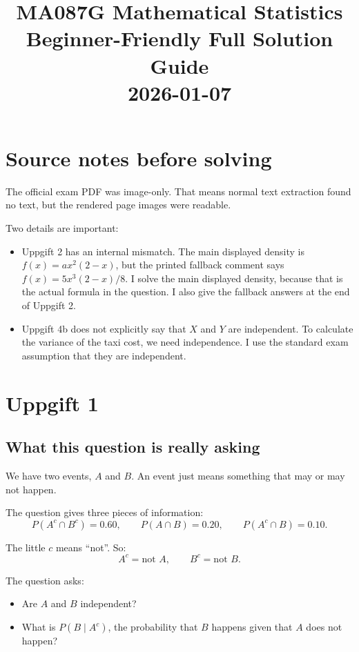 \documentclass[11pt,a4paper]{article}
\title{MA087G Mathematical Statistics\\Beginner-Friendly Full Solution Guide\\2026-01-07}
\author{}
\date{}
\begin{document}
\maketitle

\section*{Source notes before solving}
The official exam PDF was image-only. That means normal text extraction found no text, but the rendered page images were readable.

Two details are important:
\begin{itemize}[leftmargin=*]
    \item Uppgift 2 has an internal mismatch. The main displayed density is \(f(x)=a x^2(2-x)\), but the printed fallback comment says \(f(x)=5x^3(2-x)/8\). I solve the main displayed density, because that is the actual formula in the question. I also give the fallback answers at the end of Uppgift 2.
    \item Uppgift 4b does not explicitly say that \(X\) and \(Y\) are independent. To calculate the variance of the taxi cost, we need independence. I use the standard exam assumption that they are independent.
\end{itemize}

\section*{Uppgift 1}

\subsection*{What this question is really asking}
We have two events, \(A\) and \(B\). An event just means something that may or may not happen.

The question gives three pieces of information:
\[
P(A^c\cap B^c)=0.60,\qquad P(A\cap B)=0.20,\qquad P(A^c\cap B)=0.10.
\]

The little \(c\) means ``not''. So:
\[
A^c=\text{not }A,\qquad B^c=\text{not }B.
\]

The question asks:
\begin{itemize}[leftmargin=*]
    \item Are \(A\) and \(B\) independent?
    \item What is \(P(B\mid A^c)\), the probability that \(B\) happens given that \(A\) does not happen?
\end{itemize}
\end{document}
